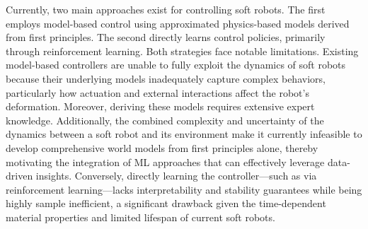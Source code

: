 Currently, two main approaches exist for controlling soft robots. The first employs model-based control using approximated physics-based models derived from first principles. The second directly learns control policies, primarily through reinforcement learning. Both strategies face notable limitations. Existing model-based controllers are unable to fully exploit the dynamics of soft robots because their underlying models inadequately capture complex behaviors, particularly how actuation and external interactions affect the robot’s deformation. Moreover, deriving these models requires extensive expert knowledge. Additionally, the combined complexity and uncertainty of the dynamics between a soft robot and its environment make it currently infeasible to develop comprehensive world models from first principles alone, thereby motivating the integration of \gls{ML} approaches that can effectively leverage data-driven insights. Conversely, directly learning the controller—such as via reinforcement learning—lacks interpretability and stability guarantees while being highly sample inefficient, a significant drawback given the time-dependent material properties and limited lifespan of current soft robots.


